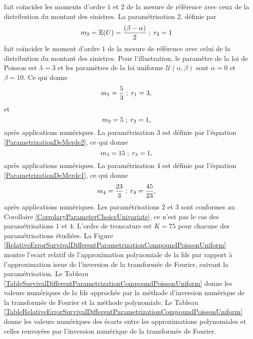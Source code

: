 fait coïncider les moments d\rq{}ordre $1$ et $2$ de la mesure de référence avec ceux de la distribution du montant des sinistres. La paramétrisation $2$, définie par
\begin{equation*}\label{CompoundPoissonUniformParametrization2}
m_{2}=\mathbb{E}(U)=\frac{(\beta-\alpha)}{2}\hspace{0.1cm};\hspace{0.1cm}r_{2}=1
\end{equation*}
fait coïncider le moment d\rq{}ordre $1$ de la mesure de référence avec celui de la distribution du montant des sinistres. Pour l\rq{}illustration, le paramètre de la loi de Poisson est $\lambda=3$ et les paramètres de la loi uniforme $\mathcal{U}(\alpha,\beta)$ sont $\alpha=0$ et $\beta=10$. Ce qui donne 
\begin{equation}\label{CompoundPoissonUniformParametrization1}
m_{1}=\frac{5}{3}\hspace{0.1cm};\hspace{0.1cm}r_{1}=3,
\end{equation}
et 
\begin{equation}\label{CompoundPoissonUniformParametrization1}
m_{2}=5\hspace{0.1cm};\hspace{0.1cm}r_{2}=1,
\end{equation}
après applications numériques. La paramétrisation $3$ est définie par l\rq{}équation \eqref{ParametrizationDeMerde2}, ce qui donne 
\begin{equation}\label{CompoundPoissonUniformParametrization3}
m_{3}=15\hspace{0.1cm};\hspace{0.1cm}r_{3}=1,
\end{equation}
après applications numériques. La paramétrisation $4$ est définie par l\rq{}équation \eqref{ParametrizationDeMerde1}, ce qui donne 
\begin{equation}\label{CompoundPoissonGammaParametrization4}
m_{4}=\frac{23}{3}\hspace{0.1cm};\hspace{0.1cm}r_{4}=\frac{45}{23},
\end{equation}
après applications numériques. Les paramétrisations $2$ et $3$ sont conformes au Corollaire \ref{CorrolaryParameterChoiceUnivariate}, ce n\rq{}est pas le cas des paramétrisations $1$ et $4$. L\rq{}ordre de troncature est $K=75$ pour chacune des paramétrisations étudiées. La Figure \ref{RelativeErrorSurvivalDifferentParametrizationCompoundPoissonUniform} montre l\rq{}ecart relatif de l\rq{}approximation polynomiale de la \gls{fds} par rapport à l\rq{}approximation issue de l\rq{}inversion de la transformée de Fourier, suivant la paramétrisation. Le Tableau \ref{TableSurvivalDifferentParametrizationCompoundPoissonUniform} donne les valeurs numériques de la \gls{fds} approchée par la méthode d\rq{}inversion numérique de la transformée de Fourier et la méthode polynomiale. Le Tableau \ref{TableRelativeErrorSurvivalDifferentParametrizationCompoundPoissonUniform} donne les valeurs numériques des écarts entre les approximations polynomiales et celles renvoyées par l\rq{}inversion numérique de la transformée de Fourier. \\
